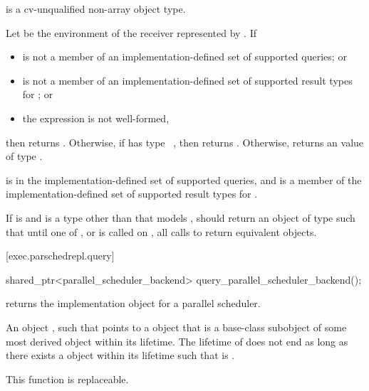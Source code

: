 \begin{itemdescr}
\pnum
\mandates
{} is a cv-unqualified non-array object type.

\pnum
\returns
Let  be the environment of the receiver represented by .
If
\begin{itemize}
\item
{} is not a member of an implementation-defined set
of supported queries; or
\item
{} is not a member of an implementation-defined set
of supported result types for ; or
\item
the expression  is not well-formed,
\end{itemize}
then returns .
Otherwise, if  has type \cv{}~,
then returns .
Otherwise, returns an
 value
of type .

\pnum
\remarks
{} is
in the implementation-defined set of supported queries, and
 is a member
of the implementation-defined set of supported result types
for .

\pnum
\recommended
If  is  and
 is a type other than 
that models ,
 should return an object of type 
such that until one of
,
 or
is called on ,
all calls to  return equivalent  objects.
\end{itemdescr}

[exec.parschedrepl.query]{}

%
\begin{itemdecl}
shared_ptr<parallel_scheduler_backend> query_parallel_scheduler_backend();
\end{itemdecl}

\begin{itemdescr}
\pnum
{} returns
the implementation object for a parallel scheduler.

\pnum
\returns
An object ,
such that  points to a  object
that is a base-class subobject
of some most derived object  within its lifetime.
The lifetime of  does not end
as long as there exists a  object  within its lifetime
such that  is .

\pnum
\remarks
This function is replaceable.
\end{itemdescr}

